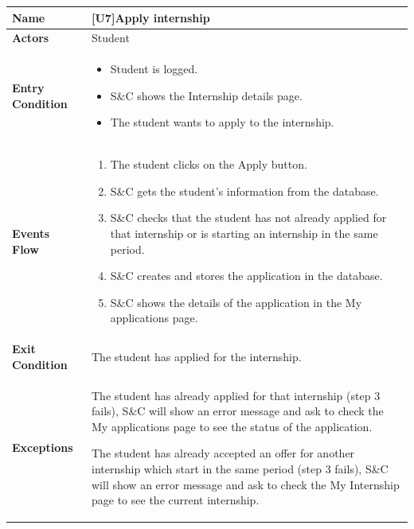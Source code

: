 \begin{center}
    \begin{tabular}{|p{9em}|p{27em}|}
        \hline
        \rowcolor{bluepoli!40}
        \textbf{Name} & \textbf{[U7]Apply internship} \\
        \hline
        \textbf{Actors} & Student \\
        \hline
        \textbf{Entry Condition} & 
        \begin{itemize}
            \item Student is logged.
            \item S\&C shows the Internship details page.
            \item The student wants to apply to the internship.
        \end{itemize} \\
        \hline
        \textbf{Events Flow} & 
        \begin{enumerate}
            \item The student clicks on the Apply button.
            \item S\&C gets the student's information from the database.
            \item S\&C checks that the student has not already applied for that internship or is starting an internship in the same period.
            \item S\&C creates and stores the application in the database.
            \item S\&C shows the details of the application in the My applications page.
        \end{enumerate} \\
        \hline
        \textbf{Exit Condition} & The student has applied for the internship. \\
        \hline
        \textbf{Exceptions} & The student has already applied for that internship (step 3 fails), S\&C will show an error message and ask to
        check the My applications page to see the status of the application. 
        
        The student has already accepted an offer for another internship which start in the same period (step 3 fails), S\&C will show an 
        error message and ask to check the My Internship page to see the current internship.\\
        \hline
    \end{tabular}
\end{center}

